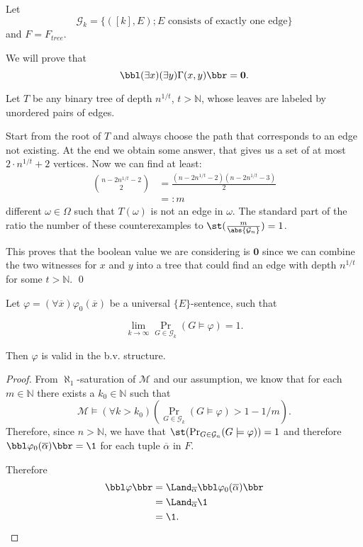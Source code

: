 \begin{exam}
Let \[\mathcal{G}_k=\{([k],E);\text{$E$ consists of exactly one edge}\}\]
and $F=F_{tree}$.

We will prove that \[\bbl(\exists x)(\exists y)\Gamma(x,y)\bbr=\textbf{0}.\]

Let $T$ be any binary tree of depth $n^{1/t}$, $t>\mathbb{N}$, whose leaves are labeled by unordered pairs of edges.

Start from the root of $T$ and always choose the path that corresponds to an edge not existing. At the end we obtain some answer, that gives us a set of at most $2 \cdot n^{1/t}+2$ vertices. Now we can find at least: 
\begin{align}
\binom{n-2n^{1/t}-2}{2}&=\frac{(n-2n^{1/t}-2)(n-2n^{1/t}-3)}{2}\\
&=:m
\end{align}
different $\omega\in\Omega$ such that $T(\omega)$ is not an edge in $\omega$. The standard part of the ratio the number of these counterexamples to $\st(\frac{m}{\abs{\mathcal{G}_n}})= 1$. 

This proves that the boolean value we are considering is $\textbf{0}$ since we can combine the two witnesses for $x$ and $y$ into a tree that could find an edge with depth $n^{1/t}$ for some $t>\mathbb{N}$. \qed

\end{exam}

\begin{thrm}\label{thrmusbv}
Let $\varphi=(\forall \overline x)\varphi_0(\overline x)$ be a universal $\{E\}$-sentence, such that

\[\lim_{k\to\infty}\Pr_{G\in\mathcal{G}_k}(G\models\varphi)=1.\]

Then $\varphi$ is valid in the b.v. structure.


\end{thrm}

\begin{proof}

From $\aleph_1$-saturation of $\mathcal{M}$ and our assumption, we know that for each $m\in\mathbb{N}$ there exists a $k_0\in\mathbb{N}$ such that \[\mathcal{M}\models(\forall k>k_0)\left(\Pr_{G\in\mathcal{G}_k}(G\models \varphi)>1-1/m\right).\]
Therefore, since $n>\mathbb{N}$, we have that $\st(\Pr_{G\in\mathcal{G}_n}(G\models\varphi))=1$ and therefore $\bbl\varphi_0(\overline\alpha)\bbr=\1$ for each tuple $\overline\alpha$ in $F$.

Therefore
\begin{align}
\bbl\varphi\bbr&=\Land_{\overline\alpha}\bbl\varphi_0(\overline\alpha)\bbr\\
&=\Land_{\overline\alpha}\1\\
&=\1.
\end{align}
\end{proof}

